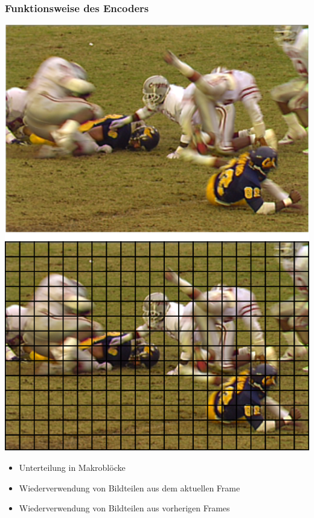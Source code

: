 \documentclass[t]{beamer}
\begin{document}
\begin{frame}
	\frametitle{Funktionsweise des Encoders}
	\begin{minipage}{5.5cm}
		\includegraphics[scale=.29]{football-grid.png}	
	\end{minipage}
	\begin{minipage}{5.5cm}
		\begin{itemize}
			\item<+-> Unterteilung in Makroblöcke
			\item<+-> Wiederverwendung von Bildteilen aus dem aktuellen Frame
			\item<+-> Wiederverwendung von Bildteilen aus vorherigen Frames
		\end{itemize}
	\end{minipage}
\end{frame}
\end{document}
